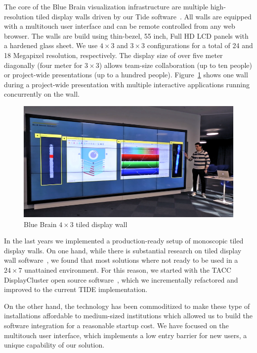 \documentclass[10pt]{llncs}
\newcommand{\fig}[1]{Figure~\ref{#1}}
\begin{document}
The core of the Blue Brain visualization infrastructure are multiple
high-resolution tiled display walls driven by our Tide software~\cite{tide}. All
walls are equipped with a multitouch user interface and can be remote controlled
from any web browser. The walls are build using thin-bezel, 55 inch, Full HD LCD
panels with a hardened glass sheet. We use $4\times 3$ and $3\times 3$
configurations for a total of 24 and 18 Megapixel resolution, respectively. The
display size of over five meter diagonally (four meter for $3\times 3$) allows
team-size collaboration (up to ten people) or project-wide presentations (up to
a hundred people). \fig{fTDW} shows one wall during a project-wide presentation
with multiple interactive applications running concurrently on the wall.

\begin{figure}[h!t]
  \includegraphics[width=\columnwidth]{images/tdw}
  \caption{\label{fTDW}Blue Brain $4\times 3$ tiled display wall}
\end{figure}

In the last years we implemented a production-ready setup of monoscopic tiled
display walls. On one hand, while there is substantial research on tiled display
wall software~\cite{Sage, Sage2, Omegalib, DK:11, JLMV:06, DisplayCluster}, we
found that most solutions where not ready to be used in a $24\times 7$
unattained environment. For this reason, we started with the TACC DisplayCluster
open source software~\cite{DisplayCluster}, which we incrementally refactored
and improved to the current TIDE implementation.

On the other hand, the technology has been commoditized to make these type of
installations affordable to medium-sized institutions which allowed us to build
the software integration for a reasonable startup cost. We have focused on the
multitouch user interface, which implements a low entry barrier for new users,
a unique capability of our solution.
\end{document}

